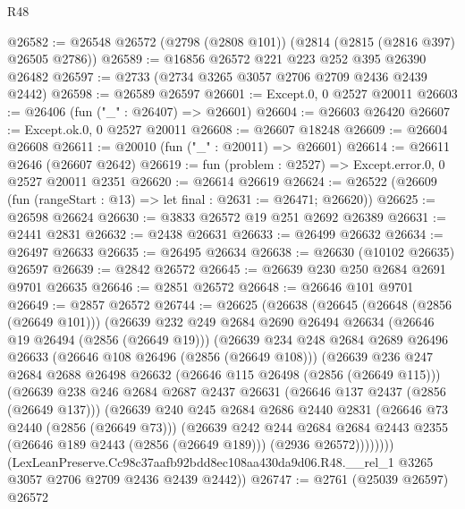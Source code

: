 \begin{lexlean}{R48}
\begin{coremodule}
@26582 := @26548 @26572 (@2798 (@2808 @101)) (@2814 (@2815 (@2816 @397) @26505 @2786))
@26589 := @16856 @26572 @221 @223 @252 @395 @26390 @26482
@26597 := @2733 (@2734 @3265 @3057 @2706 @2709 @2436 @2439 @2442)
@26598 := @26589 @26597
@26601 := Except.{0, 0} @2527 @20011
@26603 := @26406 (fun ("_" : @26407) => @26601)
@26604 := @26603 @26420
@26607 := Except.ok.{0, 0} @2527 @20011
@26608 := @26607 @18248
@26609 := @26604 @26608
@26611 := @20010 (fun ("_" : @20011) => @26601)
@26614 := @26611 @2646 (@26607 @2642)
@26619 := fun (problem : @2527) => Except.error.{0, 0} @2527 @20011 @2351
@26620 := @26614 @26619
@26624 := @26522 (@26609 (fun (rangeStart : @13) => let final : @2631 := @26471; @26620))
@26625 := @26598 @26624
@26630 := @3833 @26572 @19 @251 @2692 @26389
@26631 := @2441 @2831
@26632 := @2438 @26631
@26633 := @26499 @26632
@26634 := @26497 @26633
@26635 := @26495 @26634
@26638 := @26630 (@10102 @26635) @26597
@26639 := @2842 @26572
@26645 := @26639 @230 @250 @2684 @2691 @9701 @26635
@26646 := @2851 @26572
@26648 := @26646 @101 @9701
@26649 := @2857 @26572
@26744 := @26625
    (@26638
      (@26645
        (@26648 (@2856 (@26649 @101)))
        (@26639
          @232
          @249
          @2684
          @2690
          @26494
          @26634
          (@26646 @19 @26494 (@2856 (@26649 @19)))
          (@26639
            @234
            @248
            @2684
            @2689
            @26496
            @26633
            (@26646 @108 @26496 (@2856 (@26649 @108)))
            (@26639
              @236
              @247
              @2684
              @2688
              @26498
              @26632
              (@26646 @115 @26498 (@2856 (@26649 @115)))
              (@26639
                @238
                @246
                @2684
                @2687
                @2437
                @26631
                (@26646 @137 @2437 (@2856 (@26649 @137)))
                (@26639
                  @240
                  @245
                  @2684
                  @2686
                  @2440
                  @2831
                  (@26646 @73 @2440 (@2856 (@26649 @73)))
                  (@26639
                    @242
                    @244
                    @2684
                    @2684
                    @2443
                    @2355
                    (@26646 @189 @2443 (@2856 (@26649 @189)))
                    (@2936 @26572))))))))
      (LexLeanPreserve.Cc98c37aafb92bdd8ec108aa430da9d06.R48.__rel_1
        @3265
        @3057
        @2706
        @2709
        @2436
        @2439
        @2442))
@26747 := @2761 (@25039 @26597) @26572

\end{coremodule}
\end{lexlean}
